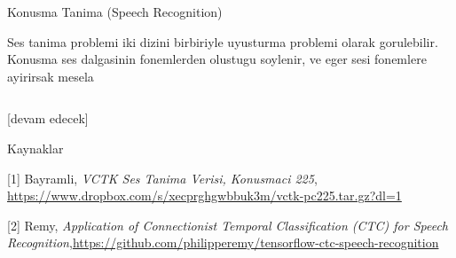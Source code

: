 \documentclass[12pt,fleqn]{article}\usepackage{../../common}
\begin{document}
Konusma Tanima (Speech Recognition)

Ses tanima problemi iki dizini birbiriyle uyusturma problemi olarak
gorulebilir. Konusma ses dalgasinin fonemlerden olustugu soylenir, ve eger
sesi fonemlere ayirirsak mesela 




\inputminted[fontsize=\footnotesize]{python}{train.py}


[devam edecek]

Kaynaklar

[1] Bayramli, {\em VCTK Ses Tanima Verisi, Konusmaci 225}, \url{https://www.dropbox.com/s/xecprghgwbbuk3m/vctk-pc225.tar.gz?dl=1}

[2] Remy, {\em Application of Connectionist Temporal Classification (CTC) for Speech Recognition},\url{https://github.com/philipperemy/tensorflow-ctc-speech-recognition}
\end{document}
